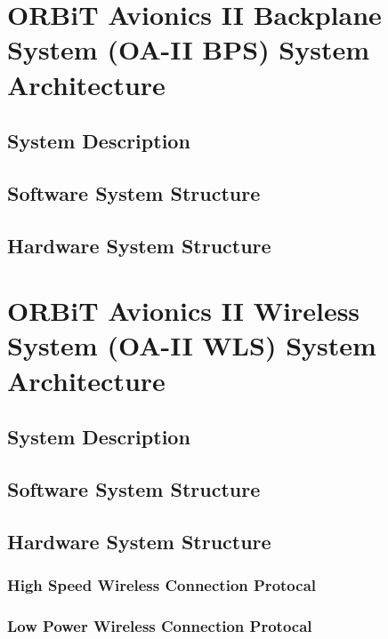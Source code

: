 \documentclass[12pt,article]{memoir}
\begin{document}
\chapter{ORBiT Avionics II Backplane System (OA-II BPS) System Architecture}
\section{System Description}
\section{Software System Structure}
\section{Hardware System Structure}
\chapter{ORBiT Avionics II Wireless System (OA-II WLS) System Architecture}
\section{System Description}
\section{Software System Structure}
\section{Hardware System Structure}
\subsection{High Speed Wireless Connection Protocal}
\subsection{Low Power Wireless Connection Protocal}

\end{document}
